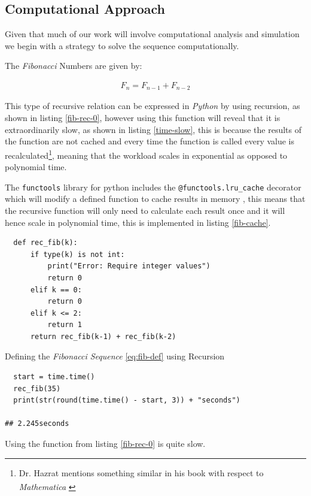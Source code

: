 \documentclass[11pt]{article}
\begin{document}
\subsection{Computational Approach}
\label{define-the-fibonacci-numbers}
Given that much of our work will involve computational analysis and simulation we begin with a strategy to solve the sequence computationally.

The \emph{Fibonacci} Numbers are given by:

\begin{align}
F_n = F_{n-1} + F_{n-2} \label{eq:fib-def}
\end{align}

This type of recursive relation can be expressed in \emph{Python} by using recursion,
as shown in listing \ref{fib-rec-0}, however using this function will reveal that it
is extraordinarily slow, as shown in listing \ref{time-slow}, this is because the
results of the function are not cached and every time the function is called
every value is recalculated\footnote{Dr. Hazrat mentions something similar in his book with respect to
\emph{Mathematica}\textsuperscript{\textregistered}
\cite[Ch. 13]{hazratMathematicaProblemCenteredApproach2015}}, meaning that the workload scales in
exponential as opposed to polynomial time.

The \texttt{functools} library for python includes the \texttt{@functools.lru\_cache} decorator
which will modify a defined function to cache results in memory
\cite{FunctoolsHigherorderFunctions}, this means that the recursive function will
only need to calculate each result once and it will hence scale in polynomial
time, this is implemented in listing \ref{fib-cache}.


\begin{listing}[htbp]
\begin{verbatim}
  def rec_fib(k):
      if type(k) is not int:
          print("Error: Require integer values")
          return 0
      elif k == 0:
          return 0
      elif k <= 2:
          return 1
      return rec_fib(k-1) + rec_fib(k-2)
\end{verbatim}
\caption{\label{fib-rec-0}Defining the \emph{Fibonacci Sequence} \eqref{eq:fib-def} using Recursion}
\end{listing}

\begin{listing}[htbp]
\begin{verbatim}
  start = time.time()
  rec_fib(35)
  print(str(round(time.time() - start, 3)) + "seconds")

## 2.245seconds
\end{verbatim}
\caption{\label{time-slow}Using the function from listing \ref{fib-rec-0} is quite slow.}
\end{listing}
\end{document}
